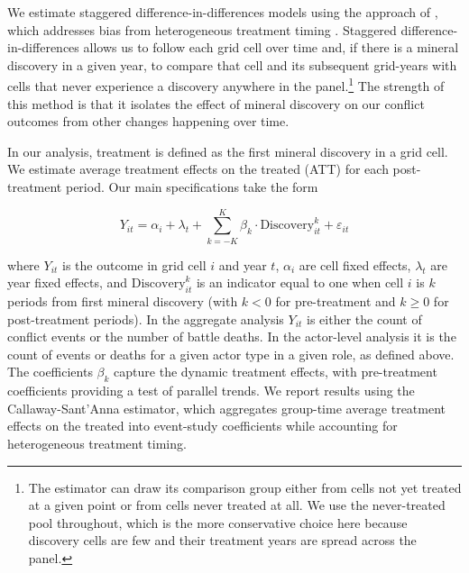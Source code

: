 \documentclass[11pt]{article}
\begin{document}
We estimate staggered difference-in-differences models using the approach of \citet{callaway2021difference}, which addresses bias from heterogeneous treatment timing \citep[see also][]{goodman2021difference, sun2021estimating}. Staggered difference-in-differences allows us to follow each grid cell over time and, if there is a mineral discovery in a given year, to compare that cell and its subsequent grid-years with cells that never experience a discovery anywhere in the panel.\footnote{The estimator can draw its comparison group either from cells not yet treated at a given point or from cells never treated at all. We use the never-treated pool throughout, which is the more conservative choice here because discovery cells are few and their treatment years are spread across the panel.} The strength of this method is that it isolates the effect of mineral discovery on our conflict outcomes from other changes happening over time.

In our analysis, treatment is defined as the first mineral discovery in a grid cell. We estimate average treatment effects on the treated (ATT) for each post-treatment period. Our main specifications take the form

\begin{equation}
Y_{it} = \alpha_i + \lambda_t + \sum_{k=-K}^{K} \beta_k \cdot \text{Discovery}_{it}^k + \varepsilon_{it}
\end{equation}

\noindent where $Y_{it}$ is the outcome in grid cell $i$ and year $t$, $\alpha_i$ are cell fixed effects, $\lambda_t$ are year fixed effects, and $\text{Discovery}_{it}^k$ is an indicator equal to one when cell $i$ is $k$ periods from first mineral discovery (with $k < 0$ for pre-treatment and $k \geq 0$ for post-treatment periods). In the aggregate analysis $Y_{it}$ is either the count of conflict events or the number of battle deaths. In the actor-level analysis it is the count of events or deaths for a given actor type in a given role, as defined above. The coefficients $\beta_k$ capture the dynamic treatment effects, with pre-treatment coefficients providing a test of parallel trends. We report results using the Callaway-Sant'Anna estimator, which aggregates group-time average treatment effects on the treated into event-study coefficients while accounting for heterogeneous treatment timing.
\end{document}
